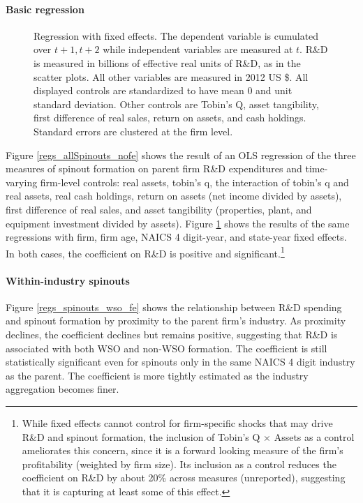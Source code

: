 \documentclass[11pt,english]{article}
\theoremstyle{remark}
\begin{document}
\paragraph{Basic regression}

\begin{figure}[h]
	\footnotesize
	\centering
	
	\caption{\footnotesize Regression with fixed effects. The dependent variable is cumulated over $t+1,t+2$ while independent variables are measured at $t$. R\&D is measured in billions of effective real units of R\&D, as in the scatter plots. All other variables are measured in 2012 US \$. All displayed controls are standardized to have mean 0 and unit standard deviation. Other controls are Tobin's Q, asset tangibility, first difference of real sales, return on assets, and cash holdings. Standard errors are clustered at the firm level.}
	\label{regs_allSpinouts_fe}
\end{figure}

Figure \ref{regs_allSpinouts_nofe} shows the result of an OLS regression of the three measures of spinout formation on parent firm R\&D expenditures and time-varying firm-level controls: real assets, tobin's q, the interaction of tobin's q and real assets, real cash holdings, return on assets (net income divided by assets), first difference of real sales, and asset tangibility (properties, plant, and equipment investment divided by assets). Figure \ref{regs_allSpinouts_fe} shows the results of the same regressions with firm, firm age, NAICS 4 digit-year, and state-year fixed effects. In both cases, the coefficient on R\&D is positive and significant.\footnote{While fixed effects cannot control for firm-specific shocks that may drive R\&D and spinout formation, the inclusion of Tobin's Q $\times$ Assets as a control ameliorates this concern, since it is a forward looking measure of the firm's profitability (weighted by firm size). Its inclusion as a control reduces the coefficient on R\&D by about 20\% across measures (unreported), suggesting that it is capturing at least some of this effect.} 

\paragraph{Within-industry spinouts}

Figure \ref{regs_spinouts_wso_fe} shows the relationship between R\&D spending and spinout formation by proximity to the parent firm's industry. As proximity declines, the coefficient declines but remains positive, suggesting that R\&D is associated with both WSO and non-WSO formation. The coefficient is still statistically significant even for spinouts only in the same NAICS 4 digit industry as the parent. The coefficient is more tightly estimated as the industry aggregation becomes finer.
\end{document}
